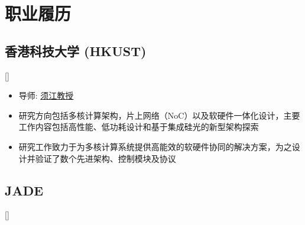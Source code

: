 \documentclass{mycv}
\begin{document}
\maketitle%

%
%

\section{职业履历}

\subsection{香港科技大学 (HKUST)}[]
\begin{positions}
\end{positions}

\begin{itemize}
  \item 导师: \href{https://eexu.home.ece.ust.hk/}{须江教授}
  \item 研究方向包括多核计算架构，片上网络（NoC）以及软硬件一体化设计，主要工作内容包括高性能、低功耗设计和基于集成硅光的新型架构探索
  \item 研究工作致力于为多核计算系统提供高能效的软硬件协同的解决方案，为之设计并验证了数个先进架构、控制模块及协议
\end{itemize}

\subsection{JADE}[]
\begin{positions}
\end{positions}
\end{document}
